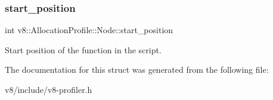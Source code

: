 \subsubsection{\texorpdfstring{start\+\_\+position}{start\_position}}
{\footnotesize\ttfamily int v8\+::\+Allocation\+Profile\+::\+Node\+::start\+\_\+position}

Start position of the function in the script. 

The documentation for this struct was generated from the following file\+:\begin{DoxyCompactItemize}
\item 
v8/include/v8-\/profiler.\+h\end{DoxyCompactItemize}
